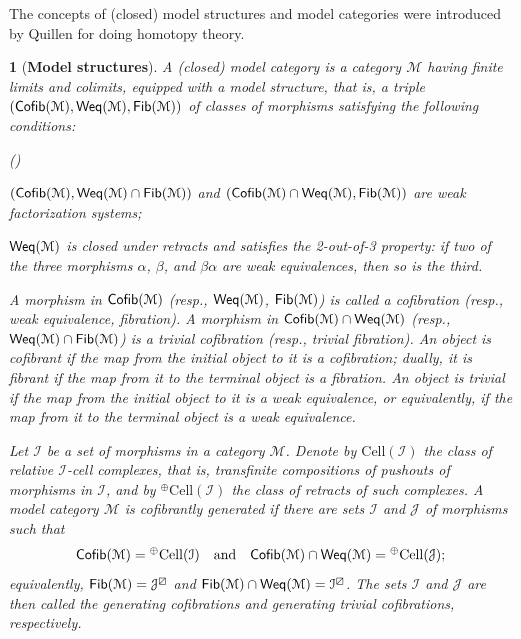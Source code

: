 \documentclass[12pt,twoside]{amsart}
\theoremstyle{bfupright head,slanted body}
\theoremstyle{bfupright head,upright body}
\newtheorem{bfhpg}[res]{}               \newtheorem*{bfhpg*}{}
\theoremstyle{fixed bf head,slanted body}
\theoremstyle{fixed bf head,upright body}
\theoremstyle{numbered paragraph}
\newlength{\thmlistleft}        %
\newlength{\thmlistright}       %
\newlength{\thmlistpartopsep}   %
\newlength{\thmlisttopsep}      %
\newlength{\thmlistparsep}      %
\newlength{\thmlistitemsep}     %
\newcounter{prt}
\newenvironment{prt}{\begin{list}{\upshape (\alph{prt})}%
    {\usecounter{prt}%
      \setlength{\leftmargin}{\thmlistleft}%
      \setlength{\labelwidth}{\thmlistleft}%
      \setlength{\rightmargin}{\thmlistright}%
      \setlength{\partopsep}{\thmlistpartopsep}%
      \setlength{\topsep}{\thmlisttopsep}%
      \setlength{\parsep}{\thmlistparsep}%
      \setlength{\itemsep}{\thmlistitemsep}}}%
  {\end{list}}%
\numberwithin{equation}{res}
\newcommand{\calM}{\mathcal{M}}
\newcommand{\Cofib}{\sf{Cofib}}
\newcommand{\Fib}{\sf{Fib}}
\newcommand{\Weq}{\sf{Weq}}
\begin{document}
The concepts of (closed) model structures and model categories were introduced by Quillen \cite{1967Quillen} for doing homotopy theory. %

\begin{bfhpg}[\bf Model structures]
A (closed) \emph{model category} is a category \(\calM\) having finite limits and colimits, equipped with a \emph{model structure}, that is, a triple \((\Cofib(\calM), \Weq(\calM), \Fib(\calM))\) of classes of morphisms satisfying the following conditions:
\begin{prt}
\item \((\Cofib(\calM), \Weq(\calM)\cap\Fib(\calM))\) and \((\Cofib(\calM)\cap\Weq(\calM), \Fib(\calM))\) are weak factorization systems;
\item \(\Weq(\calM)\) is closed under retracts and satisfies the 2-out-of-3 property: if two of the three morphisms \(\alpha\), \(\beta\), and \(\beta\alpha\) are weak equivalences, then so is the third.
\end{prt}

A morphism in \(\Cofib(\calM)\) (resp., \(\Weq(\calM)\), \(\Fib(\calM)\)) is called a {\it cofibration} (resp., {\it weak equivalence}, {\it fibration}). A morphism in \(\Cofib(\calM)\cap\Weq(\calM)\) (resp., \(\Weq(\calM)\cap\Fib(\calM)\)) is a {\it trivial cofibration} (resp., {\it trivial fibration}). An object is \emph{cofibrant} if the map from the initial object to it is a cofibration; dually, it is \emph{fibrant} if the map from it to the terminal object is a fibration. An object is \emph{trivial} if the map from the initial object to it is a weak equivalence, or equivalently, if the map from it to the terminal object is a weak equivalence.

Let \(\mathcal{I}\) be a set of morphisms in a category \(\mathcal{M}\). Denote by \(\mathrm{Cell}(\mathcal{I})\) the class of relative \(\mathcal{I}\)-cell complexes, that is, transfinite compositions of pushouts of morphisms in \(\mathcal{I}\), and by \(^{\oplus}\mathrm{Cell}(\mathcal{I})\) the class of retracts of such complexes. A model category \(\mathcal{M}\) is \emph{cofibrantly generated} if there are sets \(\mathcal{I}\) and \(\mathcal{J}\) of morphisms such that
\[
\Cofib(\mathcal{M}) = {^{\oplus}\mathrm{Cell}(\mathcal{I})}
\quad\text{and}\quad
\Cofib(\mathcal{M})\cap\Weq(\mathcal{M}) = {^{\oplus}\mathrm{Cell}(\mathcal{J})};
\]
equivalently, \(\Fib(\mathcal{M}) = \mathcal{J}^{\boxslash}\) and \(\Fib(\mathcal{M})\cap\Weq(\mathcal{M}) = \mathcal{I}^{\boxslash}\). The sets \(\mathcal{I}\) and \(\mathcal{J}\) are then called the {\it generating cofibrations} and {\it generating trivial cofibrations}, respectively.
\end{bfhpg}
\end{document}
